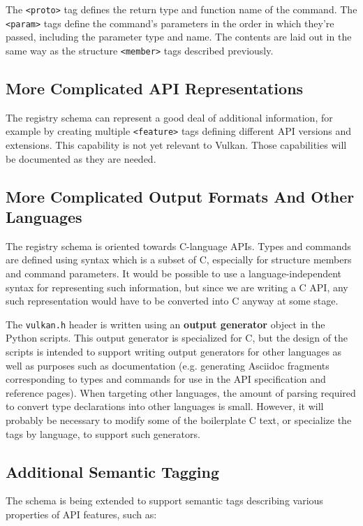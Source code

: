 \documentclass{article}
\def\code#1{{\tt #1}}
\def\tag#1{{\tt <#1>\index{<#1>}}}
\begin{document}
The \tag{proto} tag defines the return type and function name of the
command. The \tag{param} tags define the command's parameters in the order
in which they're passed, including the parameter type and name. The contents
are laid out in the same way as the structure \tag{member} tags described
previously.


\subsection{More Complicated API Representations}

The registry schema can represent a good deal of additional information, for
example by creating multiple \tag{feature} tags defining different API
versions and extensions. This capability is not yet relevant to Vulkan.
Those capabilities will be documented as they are needed.


\subsection{More Complicated Output Formats And Other Languages}

The registry schema is oriented towards C-language APIs. Types and commands
are defined using syntax which is a subset of C, especially for structure
members and command parameters. It would be possible to use a
language-independent syntax for representing such information, but since we
are writing a C API, any such representation would have to be converted into
C anyway at some stage.

The \code{vulkan.h} header is written using an {\bf output generator} object
in the Python scripts. This output generator is specialized for C, but the
design of the scripts is intended to support writing output generators for
other languages as well as purposes such as documentation (e.g. generating
Asciidoc fragments corresponding to types and commands for use in the API
specification and reference pages). When targeting other languages, the
amount of parsing required to convert type declarations into other languages
is small. However, it will probably be necessary to modify some of the
boilerplate C text, or specialize the tags by language, to support such
generators.


\subsection{Additional Semantic Tagging}

The schema is being extended to support semantic tags describing
various properties of API features, such as:
\end{document}
